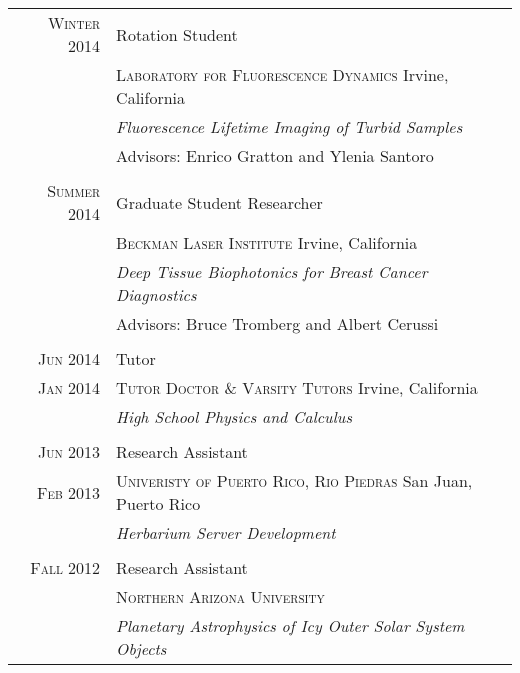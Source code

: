 \documentclass[letterpaper,10pt]{article} %
\begin{document}
\begin{tabular}{r|p{11cm}}

\textsc{Winter 2014} & Rotation Student \\
& \textsc{Laboratory for Fluorescence Dynamics} Irvine, California\\

&\emph{Fluorescence Lifetime Imaging of Turbid Samples}\\
& Advisors: Enrico Gratton and Ylenia Santoro \\

\multicolumn{2}{c}{} \\


\textsc{Summer 2014} & Graduate Student Researcher \\
& \textsc{Beckman Laser Institute} Irvine, California\\

&\emph{Deep Tissue Biophotonics for Breast Cancer Diagnostics}\\ 
& Advisors: Bruce Tromberg and Albert Cerussi \\

\multicolumn{2}{c}{} \\


\textsc{Jun 2014} & Tutor \\
\textsc{Jan 2014} & \textsc{Tutor Doctor \& Varsity Tutors} Irvine, California\\

&\emph{High School Physics and Calculus}\\ 

\multicolumn{2}{c}{} \\


\textsc{Jun 2013} & Research Assistant  \\
\textsc{Feb 2013} & \textsc{Univeristy of Puerto Rico, Rio Piedras} San Juan, Puerto Rico\\

& \emph{Herbarium Server Development}\\ 

\multicolumn{2}{c}{}\\


\textsc{Fall 2012} & Research Assistant \\
& \textsc{Northern Arizona University} \\
&\emph{Planetary Astrophysics of Icy Outer Solar System Objects}\\ 


\end{tabular}
\end{document}
